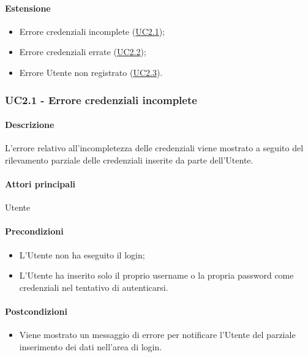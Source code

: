 \paragraph*{Estensione}
\begin{itemize}
  \item Errore credenziali incomplete (\hyperref[UC2point1]{UC2.1});
  \item Errore credenziali errate (\hyperref[UC2point2]{UC2.2});
  \item Errore Utente non registrato (\hyperref[UC2point3]{UC2.3}).
\end{itemize}


\subsubsection{UC2.1 - Errore credenziali incomplete}\label{UC2point1}
\paragraph*{Descrizione}
L’errore relativo all’incompletezza delle credenziali viene mostrato a seguito del rilevamento parziale delle credenziali inserite da parte dell’Utente.

\paragraph*{Attori principali}
Utente

\paragraph*{Precondizioni}
\begin{itemize}
  \item L’Utente non ha eseguito il login;
  \item L’Utente ha inserito solo il proprio username o la propria password come credenziali nel tentativo di autenticarsi.  
\end{itemize}

\paragraph*{Postcondizioni}
\begin{itemize}
  \item Viene mostrato un messaggio di errore per notificare l’Utente del parziale inserimento dei dati nell’area di login.
\end{itemize}

